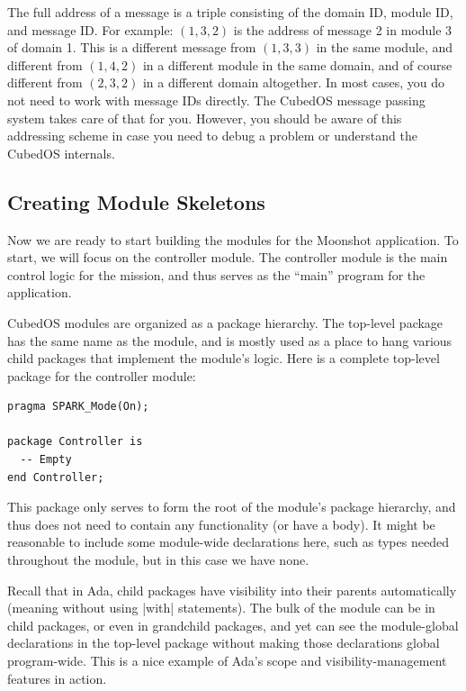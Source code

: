 The full address of a message is a triple consisting of the domain ID, module ID, and message
ID. For example: $(1, 3, 2)$ is the address of message 2 in module 3 of domain 1. This is a
different message from $(1, 3, 3)$ in the same module, and different from $(1, 4, 2)$ in a
different module in the same domain, and of course different from $(2, 3, 2)$ in a different
domain altogether. In most cases, you do not need to work with message IDs directly. The CubedOS
message passing system takes care of that for you. However, you should be aware of this
addressing scheme in case you need to debug a problem or understand the CubedOS internals.

\subsection{Creating Module Skeletons}
\label{sec:manual-tutorial-skeletons}

Now we are ready to start building the modules for the Moonshot application. To start,
we will focus on the controller module. The controller module is the main control logic for the
mission, and thus serves as the ``main'' program for the application.

CubedOS modules are organized as a package hierarchy. The top-level package has the same name as
the module, and is mostly used as a place to hang various child packages that implement the module's
logic. Here is a complete top-level package for the controller module:

\begin{verbatim}
pragma SPARK_Mode(On);

package Controller is
  -- Empty
end Controller;
\end{verbatim}

This package only serves to form the root of the module's package hierarchy, and thus does not
need to contain any functionality (or have a body). It might be reasonable to include some
module-wide declarations here, such as types needed throughout the module, but in this case we
have none.

Recall that in Ada, child packages have visibility into their parents automatically (meaning
without using |with| statements). The bulk of the module can be in child packages, or even in
grandchild packages, and yet can see the module-global declarations in the top-level package
without making those declarations global program-wide. This is a nice example of Ada's scope and
visibility-management features in action.

